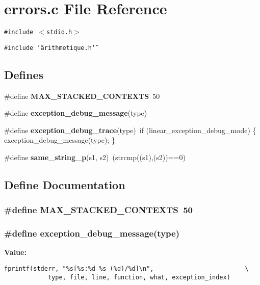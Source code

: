 \section{errors.c File Reference}
\label{errors_8c}
{\tt \#include $<$stdio.h$>$}\par
{\tt \#include \char`\"{}arithmetique.h\char`\"{}}\par
\subsection*{Defines}
\begin{CompactItemize}
\item 
\#define {\bf MAX\_\-STACKED\_\-CONTEXTS}\ 50
\item 
\#define {\bf exception\_\-debug\_\-message}(type)
\item 
\#define {\bf exception\_\-debug\_\-trace}(type)\ if (linear\_\-exception\_\-debug\_\-mode) \{ exception\_\-debug\_\-message(type); \}
\item 
\#define {\bf same\_\-string\_\-p}(s1, s2)\ (strcmp((s1),(s2))==0)
\end{CompactItemize}


\subsection{Define Documentation}
\subsubsection{\setlength{\rightskip}{0pt plus 5cm}\#define MAX\_\-STACKED\_\-CONTEXTS\ 50}\label{errors_8c_a0}


\subsubsection{\setlength{\rightskip}{0pt plus 5cm}\#define exception\_\-debug\_\-message(type)}\label{errors_8c_a1}


{\bf Value:}

\footnotesize\begin{verbatim}fprintf(stderr, "%s[%s:%d %s (%d)/%d]\n",                         \
            type, file, line, function, what, exception_index)\end{verbatim}\normalsize 
{}
